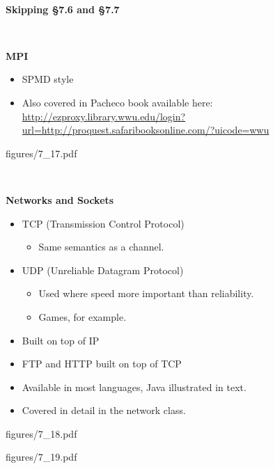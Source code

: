 \documentclass{article}
\newcommand{\nop}[1]{}
\newcommand{\myfig}[1]{\newpage\begin{overpic}[scale=1.5]{figures/#1}}
\newcommand{\myfigs}[2]{\newpage\begin{overpic}[scale=#1]{figures/#2}}
\newcommand{\myfigsp}[3]{\newpage\begin{overpic}[scale=#1,page=#2]{figures/#3}}
\newcommand{\myfigend}{\end{overpic}}
\newcommand{\bi}{\begin{itemize}}
\newcommand{\ii}{\item}
\newcommand{\ei}{\end{itemize}}
\newcommand{\ti}[1]{
\newpage
\mbox{~}

\vspace{1.25in}
\centerline{\bf #1}
}
\begin{document}
\ti{Skipping \S 7.6 and \S 7.7}
\nop{
\myfig{p322_GCD_csp.pdf}
\myfigend
\myfig{p324_copy_csp.pdf}
\myfigend
\myfig{p325_allocator_csp.pdf}
\myfigend
\myfig{p326_exchange_csp.pdf}
\myfigend
\myfig{7_15.pdf}
\myfigend
\myfig{p330_pc_occam.pdf}
\myfigend
\myfig{p331_copy_occam.pdf}
\myfigend
\myfig{p333_modernCSP.pdf}
\myfigend

\myfigsp{.9}{1}{7_16.pdf}
\myfigend
\myfigsp{.9}{2}{7_16.pdf}
\myfigend
}

\ti{MPI}

\bi
\ii SPMD style
\ii Also covered in Pacheco book available here:\\
\url{http://ezproxy.library.wwu.edu/login?url=http://proquest.safaribooksonline.com/?uicode=wwu}
\ei

\myfig{7_17.pdf}
\myfigend

\ti{Networks and Sockets}
\bi
\ii TCP (Transmission Control Protocol)
\bi\ii Same semantics as a channel.\ei
\ii UDP (Unreliable Datagram Protocol)
\bi\ii Used where speed more important than reliability.
\ii Games, for example.\ei
\ii Built on top of IP 
\ii FTP and HTTP built on top of TCP
\ii Available in most languages, Java illustrated in text.
\ii Covered in detail in the network class.
\ei


\myfigs{1.1}{7_18.pdf}
\myfigend
\myfigs{1.3}{7_19.pdf}
\myfigend
\end{document}
